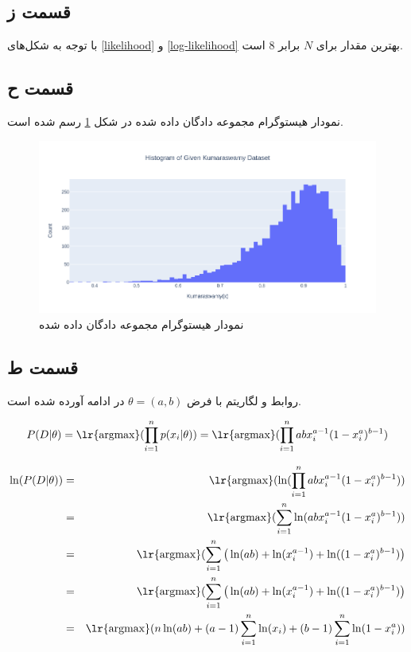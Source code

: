 \documentclass{article}
\begin{document}
\subsection*{قسمت ز}

با توجه به شکل‌های \ref{likelihood} و \ref{log-likelihood} بهترین مقدار برای $N$ برابر $8$ است.

\subsection*{قسمت ح}

نمودار هیستوگرام مجموعه دادگان داده شده در شکل \ref{kumasarawamy} رسم شده است.

\begin{figure}[h]
    \centering
    \includegraphics[scale=0.3]{images/q4/kumasarawamy.png}
    \caption{نمودار هیستوگرام مجموعه دادگان داده شده}
    \label{kumasarawamy}
\end{figure}

\subsection*{قسمت ط}

روابط  و لگاریتم  با فرض $\theta = (a, b)$ در ادامه آورده شده است.

\begin{eqnarray*}
    P(D|\theta) = \text{\lr{argmax}}(\prod_{i=1}^{n}p(x_i|\theta)) = \text{\lr{argmax}}(\prod_{i=1}^{n} abx_i^{a-1}(1-x_i^{a})^{b-1}) \\
\end{eqnarray*}
\begin{latin}
\begin{eqnarray*}
    \ln(P(D|\theta)) & = & \text{\lr{argmax}}(\ln(\prod_{i=1}^{n} abx_i^{a-1}(1-x_i^{a})^{b-1})) \\
    & = & \text{\lr{argmax}}(\sum_{i=1}^{n} \ln(abx_i^{a-1}(1-x_i^{a})^{b-1})) \\
    & = & \text{\lr{argmax}}(\sum_{i=1}^{n} \big( \ln(ab) + \ln(x_i^{a-1}) + \ln((1-x_i^{a})^{b-1}) \big) \\
    & = & \text{\lr{argmax}}(\sum_{i=1}^{n} \big( \ln(ab) + \ln(x_i^{a-1}) + \ln((1-x_i^{a})^{b-1}) \big) \\
    & = & \text{\lr{argmax}}(n\ln(ab) + (a-1) \sum_{i=1}^{n} \ln(x_i) + (b-1) \sum_{i=1}^{n} \ln(1-x_i^{a}))
\end{eqnarray*}
\end{latin}
\end{document}
